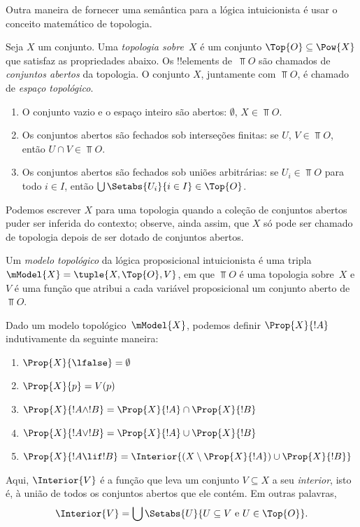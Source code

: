 \documentclass[../../../include/open-logic-section]{subfiles}
\begin{document}


Outra maneira de fornecer uma semântica para a lógica intuicionista é
usar o conceito matemático de topologia.

\begin{defn}
  Seja $X$ um conjunto. Uma \emph{topologia sobre~$X$} é um conjunto
  $\Top{O} \subseteq \Pow{X}$ que satisfaz as propriedades abaixo. Os
  !!{element}s de~$\Top{O}$ são chamados de \emph{conjuntos abertos}
  da topologia. O conjunto $X$, juntamente com $\Top{O}$, é chamado de
  \emph{espaço topológico}.
  \begin{enumerate}
  \item O conjunto vazio e o espaço inteiro são abertos: $\emptyset$, $X \in
    \Top{O}$.
  \item Os conjuntos abertos são fechados sob interseções finitas: se
    $U$, $V \in \Top{O}$, então $U \cap V \in \Top{O}$.
  \item Os conjuntos abertos são fechados sob uniões arbitrárias: se
    $U_i \in \Top{O}$ para todo $i \in I$, então $\bigcup \Setabs{U_i}{i \in
      I} \in \Top{O}$.
  \end{enumerate}
\end{defn}

Podemos escrever $X$ para uma topologia quando a coleção de conjuntos
abertos puder ser inferida do contexto; observe, ainda assim, que $X$
só pode ser chamado de topologia depois de ser dotado de conjuntos
abertos.

\begin{defn}
  Um \emph{modelo topológico} da lógica proposicional intuicionista é
  uma tripla $\mModel{X} = \tuple{X, \Top{O}, V}$, em que $\Top{O}$ é
  uma topologia sobre~$X$ e $V$ é uma função que atribui a cada
  variável proposicional um conjunto aberto de $\Top{O}$.

  Dado um modelo topológico~$\mModel{X}$, podemos definir
  $\Prop{X}{!A}$ indutivamente da seguinte maneira:
  \begin{enumerate}
  \item $\Prop{X}{\lfalse} = \emptyset$
  \item $\Prop{X}{p} = V(p)$
  \item $\Prop{X}{!A \land !B} = \Prop{X}{!A} \cap \Prop{X}{!B}$
  \item $\Prop{X}{!A \lor !B} = \Prop{X}{!A} \cup \Prop{X}{!B}$
  \item $\Prop{X}{!A \lif !B} = \Interior{(X \setminus \Prop{X}{!A}) \cup
    \Prop{X}{!B}}$
  \end{enumerate}
  Aqui, $\Interior{V}$ é a função que leva um conjunto $V \subseteq X$
  a seu \emph{interior}, isto é, à união de todos os conjuntos abertos
  que ele contém. Em outras palavras,
  \[
  \Interior{V} = \bigcup \Setabs{U}{U \subseteq V \text{ e } U \in \Top{O}}.
  \]
\end{defn}
\end{document}
